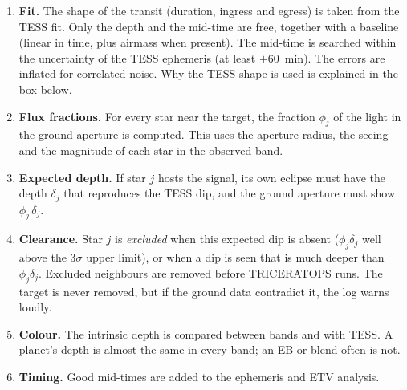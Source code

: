 \documentclass[11pt,a4paper]{report}
\begin{document}
\begin{enumerate}
\item \textbf{Fit.} The shape of the transit (duration, ingress and egress)
is taken from the TESS fit. Only the depth and the mid-time are free,
together with a baseline (linear in time, plus airmass when present). The
mid-time is searched within the uncertainty of the TESS ephemeris (at least
$\pm$60~min). The errors are inflated for correlated noise. Why the TESS
shape is used is explained in the box below.
\item \textbf{Flux fractions.} For every star near the target, the fraction
$\phi_j$ of the light in the ground aperture is computed. This uses the
aperture radius, the seeing and the magnitude of each star in the observed
band.
\item \textbf{Expected depth.} If star $j$ hosts the signal, its own
eclipse must have the depth $\delta_j$ that reproduces the TESS dip, and the
ground aperture must show $\phi_j\,\delta_j$.
\item \textbf{Clearance.} Star $j$ is \emph{excluded} when this expected dip
is absent ($\phi_j\delta_j$ well above the 3$\sigma$ upper limit), or when a
dip is seen that is much deeper than $\phi_j\delta_j$. Excluded neighbours are removed
before TRICERATOPS runs. The target is never removed, but if the ground data
contradict it, the log warns loudly.
\item \textbf{Colour.} The intrinsic depth is compared between bands and with
TESS. A planet's depth is almost the same in every band; an EB or blend often
is not.
\item \textbf{Timing.} Good mid-times are added to the ephemeris and ETV
analysis.
\end{enumerate}
\end{document}
